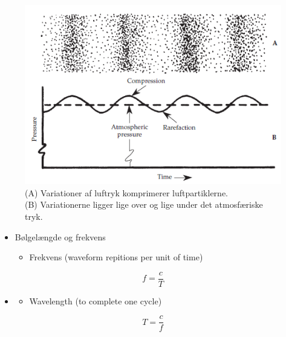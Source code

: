 \begin{figure} [H]
	\centering
	\includegraphics[width=0.85\linewidth]{graphics/2.png}
	\caption{(A) Variationer af luftryk komprimerer luftpartiklerne. \\(B) Variationerne ligger lige over og lige under det atmosfæriske tryk. }
	\label{fig:2}
\end{figure}

\begin{itemize}
	\item Bølgelængde og frekvens
	\begin{itemize}
		\item Frekvens (waveform repitions per unit of time) 
	\end{itemize}
\end{itemize}
\begin{equation}\label{eq:freq}
f = \frac{c}{T}
\end{equation}
\begin{itemize}
	\item 
	\begin{itemize}
		\item Wavelength (to complete one cycle) 
	\end{itemize}
\end{itemize}
\begin{equation}\label{eq:wave}
T = \frac{c}{f}
\end{equation}


